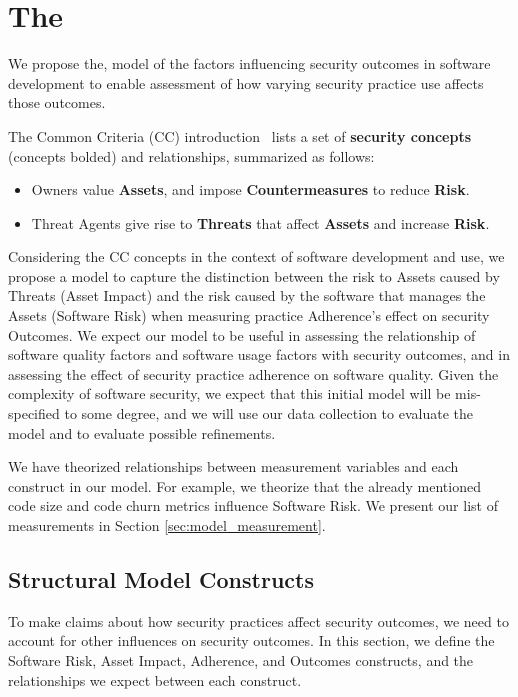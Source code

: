 \section{The \ModelName}
\label{sec:model}
We propose the, \ModelAbbr model of the factors influencing security outcomes in software development to enable assessment of how varying security practice use affects those outcomes. 
 
 The Common Criteria (CC) introduction~\cite{common2012common} lists a set of \textbf{security concepts} (concepts bolded) and relationships, summarized as follows:
 \begin{itemize}
 	\item  Owners value \textbf{Assets}, and  impose \textbf{Countermeasures} to reduce \textbf{Risk}.
 	\item Threat Agents give rise to \textbf{Threats} that affect \textbf{Assets} and increase \textbf{Risk}.
 \end{itemize}
 
 Considering the CC concepts in the context of software development and use, we propose a model to capture the distinction between the risk to Assets caused by Threats (Asset Impact) and the risk caused by the software that manages the Assets (Software Risk)  when measuring practice Adherence's effect on security Outcomes. We expect our model to be useful in assessing the relationship of software quality factors and software usage factors with security outcomes, and in assessing the effect of security practice adherence on software quality. Given the complexity of software security, we expect that this initial model will be mis-specified to some degree, and we will use our data collection to evaluate the model and to evaluate possible refinements.

We have theorized relationships between measurement variables and each construct in our model. For example, we theorize that the already mentioned code size and code churn metrics influence Software Risk. We present our list of measurements in Section \ref{sec:model_measurement}.

\subsection{Structural Model Constructs}
 \label{sec:model_structual}
To make claims about how security practices affect security outcomes, we need to account for other influences on security outcomes. In this section, we define the Software Risk, Asset Impact, Adherence, and Outcomes constructs, and the relationships we expect between each construct. 

